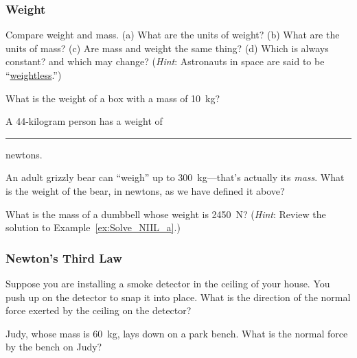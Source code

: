 \documentclass[main.tex]{subfiles}
\begin{document}
\subsubsection*{Weight}

\begin{exercise}
Compare weight and mass. (a) What are the units of weight? (b) What are the units of mass? (c) Are mass and weight the same thing? (d) Which is always constant? and which may change? (\textit{Hint}: Astronauts in space are said to be ``\href{https://youtu.be/C3GC5LS6e6Q}{weightless}.'')
\end{exercise}

\begin{exercise} \label{eStk9M}
What is the weight of a box with a mass of \SI{10}{kg}?
\end{exercise}

\begin{exercise} \label{x9Ufbz}
A 44-kilogram person has a weight of \rule{1cm}{0.15mm} newtons.
\end{exercise}

\begin{exercise} \label{r7dwXZ}
An adult grizzly bear can ``weigh'' up to \SI{300}{kg}---that's actually its \textit{mass}. What is the weight of the bear, in newtons, as we have defined it above?
\end{exercise}

\begin{exercise} \label{neLJbr}
What is the mass of a dumbbell whose weight is \SI{2450}{N}? (\textit{Hint}: Review the solution to Example~\ref{ex:Solve_NIIL_a}.)
\end{exercise}

\subsubsection*{Newton's Third Law}

\begin{exercise} \label{f03y7Z}
    Suppose you are installing a smoke detector in the ceiling of your house. You push up on the detector to snap it into place. What is the direction of the normal force exerted by the ceiling on the detector?
\end{exercise}

\begin{exercise} \label{BkOxdJ}
Judy, whose mass is \SI{60}{kg}, lays down on a park bench. What is the normal force by the bench on Judy?
\end{exercise}
\end{document}
